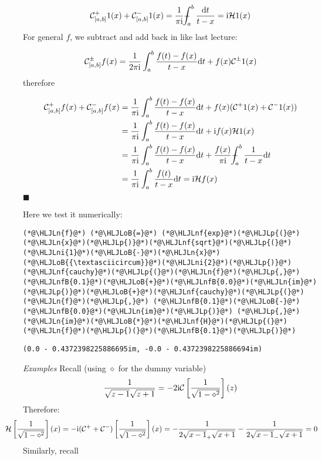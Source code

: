 \documentclass[12pt,landscape]{article}
\newcommand{\HLJLn}[1]{#1}
\newcommand{\HLJLnf}[1]{\textcolor[RGB]{66,102,213}{#1}}
\newcommand{\HLJLnfB}[1]{\textcolor[RGB]{59,151,46}{#1}}
\newcommand{\HLJLni}[1]{\textcolor[RGB]{59,151,46}{#1}}
\newcommand{\HLJLoB}[1]{\textcolor[RGB]{102,102,102}{\textbf{#1}}}
\newcommand{\HLJLp}[1]{#1}
\def\D{ {\rm d} }
\def\I{ {\rm i} }
\def\CC{ {\cal C} }
\def\HH{ {\cal H} }
\def\Xint#1{ \mathchoice
   {\XXint\displaystyle\textstyle{#1} }%
   {\XXint\textstyle\scriptstyle{#1} }%
   {\XXint\scriptstyle\scriptscriptstyle{#1} }%
   {\XXint\scriptscriptstyle\scriptscriptstyle{#1} }%
   \!\int}
\def\XXint#1#2#3{ {\setbox0=\hbox{$#1{#2#3}{\int}$}
     \vcenter{\hbox{$#2#3$}}\kern-.5\wd0} }
\def\dashint{\Xint-}
\def\dt{\D t}
\begin{document}
{\[
\CC_{[a,b]}^+ 1(x) + \CC_{[a,b]}^- 1(x) = {1 \over \pi \I} \dashint_a^b {\dt \over t -x} = \I \HH 1(x)
\]
\newpage
For general $f$, we subtract and add back in like last lecture:

\[
\CC_{[a,b]}^\pm f(x) = {1 \over 2 \pi \I} \int_a^b {f(t) - f(x) \over t-x} \dt + f(x) \CC^\pm 1(x)
\]
therefore


\begin{align*}
\CC_{[a,b]}^+ f(x) + \CC_{[a,b]}^- f(x) &= {1 \over \pi \I} \int_a^b {f(t) - f(x) \over t-x} \dt + f(x) (\CC^+ 1(x) + \CC^- 1(x) ) \\
    & = {1 \over \pi \I} \int_a^b {f(t) - f(x) \over t-x} \dt + \I  f(x) \HH 1(x)\\
    & = {1 \over \pi \I} \int_a^b {f(t) - f(x) \over t-x} \dt + {f(x)  \over \pi \I }\dashint_a^b  { 1\over t - x} \dt \\
    & = {1 \over \pi \I} \int_a^b {f(t) \over t-x} \dt =  \I \HH f(x)
\end{align*}
\ensuremath{\blacksquare}

Here we test it numerically:


\begin{lstlisting}
(*@\HLJLn{f}@*) (*@\HLJLoB{=}@*) (*@\HLJLnf{exp}@*)(*@\HLJLp{(}@*)(*@\HLJLn{x}@*)(*@\HLJLp{)}@*)(*@\HLJLnf{sqrt}@*)(*@\HLJLp{(}@*)(*@\HLJLni{1}@*)(*@\HLJLoB{-}@*)(*@\HLJLn{x}@*)(*@\HLJLoB{{\textasciicircum}}@*)(*@\HLJLni{2}@*)(*@\HLJLp{)}@*)
(*@\HLJLnf{cauchy}@*)(*@\HLJLp{(}@*)(*@\HLJLn{f}@*)(*@\HLJLp{,}@*) (*@\HLJLnfB{0.1}@*)(*@\HLJLoB{+}@*)(*@\HLJLnfB{0.0}@*)(*@\HLJLn{im}@*)(*@\HLJLp{)}@*)(*@\HLJLoB{+}@*)(*@\HLJLnf{cauchy}@*)(*@\HLJLp{(}@*)(*@\HLJLn{f}@*)(*@\HLJLp{,}@*) (*@\HLJLnfB{0.1}@*)(*@\HLJLoB{-}@*)(*@\HLJLnfB{0.0}@*)(*@\HLJLn{im}@*)(*@\HLJLp{)}@*) (*@\HLJLp{,}@*) (*@\HLJLn{im}@*)(*@\HLJLoB{*}@*)(*@\HLJLnf{H}@*)(*@\HLJLp{(}@*)(*@\HLJLn{f}@*)(*@\HLJLp{)(}@*)(*@\HLJLnfB{0.1}@*)(*@\HLJLp{)}@*)
\end{lstlisting}

\begin{lstlisting}
(0.0 - 0.4372398225886695im, -0.0 - 0.4372398225886694im)
\end{lstlisting}

\newpage
\emph{Examples} Recall  (using $\diamond$ for the dummy variable)
\[
{1 \over \sqrt{z-1} \sqrt{z+1}} = -2 \I {\cal C}\left[{1 \over \sqrt{1-\diamond^2}}\right](z)
\]
Therefore:
\[
\hspace*{-0.85 cm}
{\cal H}\left[{1 \over \sqrt{1-\diamond^2}}\right](x) = -\I (\CC^+  + \CC^-) \left[{1 \over \sqrt{1-\diamond^2}}\right](x) = -{1 \over 2  \sqrt{x-1}_+ \sqrt{x+1}} - {1 \over 2  \sqrt{x-1}_- \sqrt{x+1}} = 0
\]
Similarly, recall

}
\end{document}
